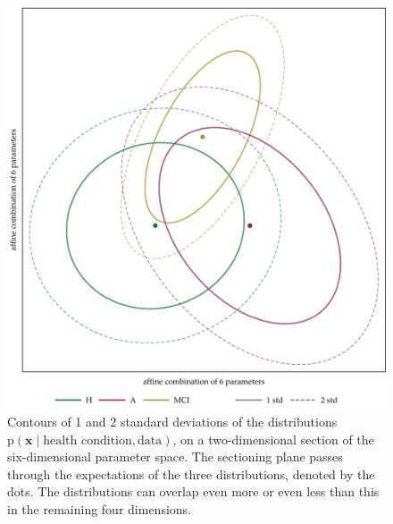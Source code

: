 \documentclass[\ifafour a4paper,12pt,\else a5paper,10pt,\fi%
onecolumn,oneside,article,%
british%
]{memoir}
\theoremstyle{remark}
\theoremstyle{innote}
\newcommand*{\pf}{\mathrm{p}}%
\renewcommand*{\|}{\mathpunct{|}}
\newcommand*{\yx}{x}
\newcommand*{\yxx}{\bm{\yx}}
\newcommand*{\data}{\text{data}}
\theoremstyle{plain}
\begin{document}
\begin{figure}[!h]
  \centering
\includegraphics[width=\linewidth]{stds_6_params.pdf}%
\caption{Contours of 1 and 2 standard deviations of the distributions
  $\pf(\yxx \| \text{health condition}, \data)$, on a two-dimensional
  section of the six-dimensional parameter space. The sectioning plane
  passes through the expectations of the three distributions, denoted by
  the dots. The distributions can overlap even more or even less than this
  in the remaining four dimensions.}
\label{results_regions}
\end{figure}
\end{document}
